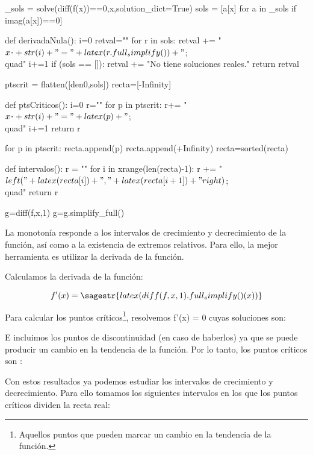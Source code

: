 \begin{sagesilent}

_sols = solve(diff(f(x))==0,x,solution_dict=True)
sols = [a[x] for a in _sols if imag(a[x])==0]

def derivadaNula():
    i=0
    retval=""
    for r in sols:
        retval += "$x_"+str(i)+" = "+latex(r.full_simplify())+"$;\\quad"
        i+=1
    if (sols == []):
        retval += "No tiene soluciones reales."
    return retval

ptscrit = flatten([den0,sols])
recta=[-Infinity]

def ptsCriticos():
    i=0
    r=""
    for p in ptscrit:
        r+= "$x_"+str(i)+"="+latex(p)+"$;\\quad"
        i+=1
    return r

for p in ptscrit:
     recta.append(p)
recta.append(+Infinity)
recta=sorted(recta)

def intervalos():
    r = ""
    for i in xrange(len(recta)-1):
        r += "$\\left("+latex(recta[i])+","+latex(recta[i+1])+"\\right)$;\\quad"  
    return r

g=diff(f,x,1)
g=g.simplify_full()
\end{sagesilent}

La monotonía responde a los intervalos de crecimiento y decrecimiento de la función, así como a la existencia de extremos relativos.
%
Para ello, la mejor herramienta es utilizar la derivada de la función.

Calculamos la derivada de la función:

\[f'(x) = \sagestr{latex(diff(f,x,1).full_simplify()(x))} \]%

Para calcular los puntos críticos\footnote{Aquellos puntos que pueden marcar un cambio en la tendencia de la función.}, resolvemos f'(x) = 0 cuyas soluciones son: 

E incluimos los puntos de discontinuidad (en caso de haberlos) ya que se puede producir un cambio en la tendencia de la función. 
%
Por lo tanto, los puntos críticos son : 


Con estos resultados ya podemos estudiar los intervalos de crecimiento y decrecimiento. 
%
Para ello tomamos los siguientes intervalos en los que los puntos críticos dividen la recta real:


